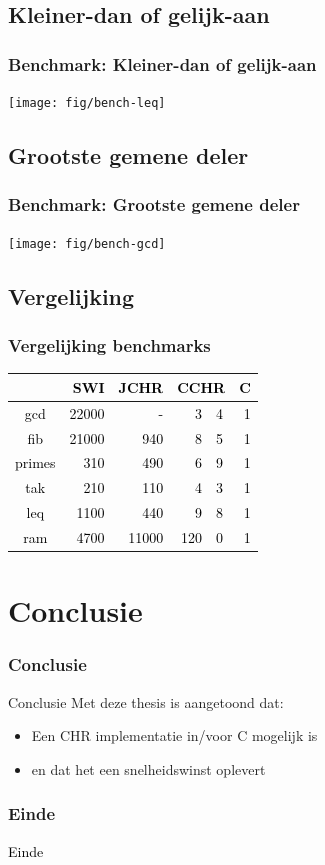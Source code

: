 \documentclass{beamer}
\newcommand{\cFront}[1]{\textcolor{black}{#1}}
\begin{document}
\subsection{Kleiner-dan of gelijk-aan}

\begin{frame}
  \frametitle{Benchmark: Kleiner-dan of gelijk-aan}
  \texttt{[image: fig/bench-leq]}
\end{frame}

\subsection{Grootste gemene deler}

\begin{frame}
  \frametitle{Benchmark: Grootste gemene deler}
  \texttt{[image: fig/bench-gcd]}
\end{frame}

\subsection{Vergelijking}

\begin{frame}
\frametitle{Vergelijking benchmarks}
\begin{center}
\cFront{\begin{tabular}{|c|rrr@{.}lr|}
\hline
 & {\bf SWI} & {\bf JCHR} & \multicolumn{2}{c}{\bf CCHR} & {\bf C} \\
\hline
gcd    & 22000 & -     &   3&4  & 1 \\
fib    & 21000 & 940   &   8&5  & 1 \\
primes & 310   & 490   &   6&9  & 1 \\
tak    & 210   & 110   &   4&3  & 1 \\
leq    & 1100  & 440   &   9&8  & 1 \\
ram    & 4700  & 11000 &  120&0 & 1 \\
\hline
\end{tabular}}
\end{center}
\end{frame}

\section{Conclusie}

\begin{frame}
  \frametitle{Conclusie}
  \begin{block}{Conclusie}
    Met deze thesis is aangetoond dat:
    \begin{itemize}
      \item Een CHR implementatie in/voor C mogelijk is
      \item en dat het een snelheidswinst oplevert
    \end{itemize}
  \end{block}
\end{frame}

\begin{frame}
  \frametitle{Einde}
  \cFront{Einde}
\end{frame}
\end{document}
